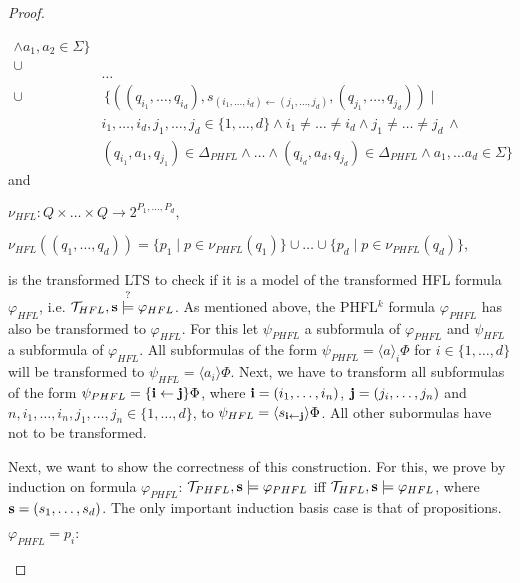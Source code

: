 \begin{proof}
\begin{compactitem}
\begin{align*}
                  \wedge a_1, a_2 \in \Sigma\} \\
            \cup &\\
            &\dots \\
                  \cup & \,\{((q_{i_1}, \dots, q_{i_d}), s_{(i_1, \dots, i_d) \leftarrow
                  (j_1, \dots, j_d)},
                  (q_{j_1}, \dots, q_{j_d})) \mid \\&
                  i_1, \dots, i_d, j_1, \dots, j_d \in \{1, \dots, d\} \wedge i_1 \neq \dots \neq i_d \wedge j_1
                  \neq \dots \neq j_d \,\wedge\\& (q_{i_1}, a_1,  q_{j_1}) \in
                  \Delta_{PHFL} \wedge \dots \wedge (q_{i_d}, a_d, q_{j_d}) \in \Delta_{PHFL}
                  \wedge a_1, \dots a_d \in \Sigma\}
        \end{align*} and
        \item $\nu_{HFL} \colon Q \times \dots \times Q \rightarrow 2^{P_1, \dots, P_d}, $

        $\nu_{HFL}((q_1, \dots, q_d)) = \{p_1 \mid p \in \nu_{PHFL}(q_1)\} \cup \dots \cup \{p_d \mid p \in
        \nu_{PHFL}(q_d)\}$,
    \end{compactitem}
    is the transformed LTS to check if it is a model of the transformed HFL formula $\varphi_{HFL}$, i.e.
    $\mathcal{T}_{HFL}, \emph{s} \overset{?}{\models} \varphi_{HFL}$. As mentioned above, the PHFL$^k$ formula
    $\varphi_{PHFL}$ has also be transformed to $\varphi_{HFL}$. For this let $\psi_{PHFL}$ a subformula of
    $\varphi_{PHFL}$ and $\psi_{HFL}$ a subformula of $\varphi_{HFL}$. All subformulas of the form $\psi_{PHFL} =
    \langle a \rangle_i \Phi$ for $i \in \{1, \dots, d\}$ will be transformed to $\psi_{HFL} = \langle
    a_i \rangle \Phi$. Next, we have to transform all subformulas of the form $\psi_{PHFL} = \{\emph{i}
    \leftarrow \emph{j}\} \Phi$, where $\emph{i} = (i_1, \dots, i_n)$, $\emph{j} = (j_i, \dots, j_n)$ and $n, i_1,
    \dots, i_n, j_1, \dots, j_n \in \{1, \dots, d\}$, to $\psi_{HFL} = \langle s_{\emph{i} \leftarrow \emph{j}}
    \rangle \Phi$. All other subormulas have not to be transformed.

    Next, we want to show the correctness of this construction. For this, we prove by induction on formula
    $\varphi_{PHFL}$: $\mathcal{T}_{PHFL}, \emph{s} \models \varphi_{PHFL}$ iff $\mathcal{T}_{HFL}, \emph{s} \models
    \varphi_{HFL}$, where $\emph{s} = (s_1, \dots, s_d)$. The only important induction basis case is that of
    propositions.
    \begin{compactitem}
        \item $\varphi_{PHFL} = p_i \colon $


\end{compactitem}
\end{proof}
